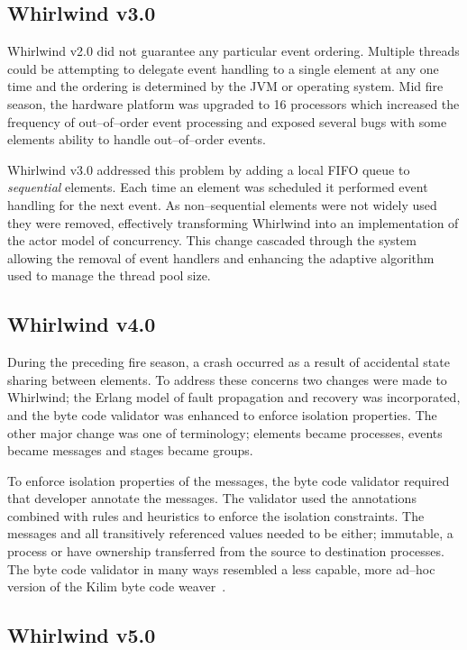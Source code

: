 \documentclass[conference]{IEEEtran}
\begin{document}
\subsection{Whirlwind v3.0}

Whirlwind v2.0 did not guarantee any particular event ordering. Multiple threads could be attempting to delegate event handling to a single element at any one time and the ordering is determined by the JVM or operating system. Mid fire season, the hardware platform was upgraded to 16 processors which increased the frequency of out--of--order event processing and exposed several bugs with some elements ability to handle out--of--order events. 

Whirlwind v3.0 addressed this problem by adding a local FIFO queue to \emph{sequential} elements. Each time an element was scheduled it performed event handling for the next event. As non--sequential elements were not widely used they were removed, effectively transforming Whirlwind into an implementation of the actor model of concurrency. This change cascaded through the system allowing the removal of event handlers and enhancing the adaptive algorithm used to manage the thread pool size. 

\subsection{Whirlwind v4.0}

During the preceding fire season, a crash occurred as a result of accidental state sharing between elements. To address these concerns two changes were made to Whirlwind; the Erlang model of fault propagation and recovery was incorporated, and the byte code validator was enhanced to enforce isolation properties. The other major change was one of terminology; elements became processes, events became messages and stages became groups.

To enforce isolation properties of the messages, the byte code validator required that developer annotate the messages. The validator used the annotations combined with rules and heuristics to enforce the isolation constraints. The messages and all transitively referenced values needed to be either; immutable, a process or have ownership transferred from the source to destination processes. The byte code validator in many ways resembled a less capable, more ad--hoc version of the Kilim byte code weaver~\cite{Srinivasan:08:Kilim}.

\subsection{Whirlwind v5.0}
\end{document}
